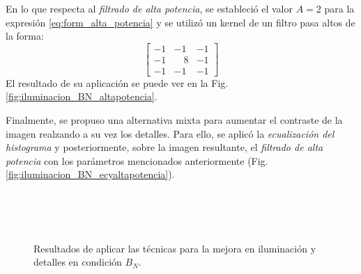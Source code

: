 En lo que respecta al \textit{filtrado de alta potencia}, se estableció el valor $A=2$ para la expresión \eqref{eq:form_alta_potencia} y se utilizó un kernel de un filtro pasa altos de la forma:
\begin{equation}
\label{eq:kernel_altapotencia}
\begin{bmatrix}
-1 & -1 & -1\\
-1 & \quad8 & -1\\
-1 & -1 & -1
\end{bmatrix}
\end{equation}
El resultado de su aplicación se puede ver en la Fig. \ref{fig:iluminacion_BN_altapotencia}.

Finalmente, se propuso una alternativa mixta para aumentar el contraste de la imagen realzando a su vez los detalles. Para ello, se aplicó la \textit{ecualización del histograma} y posteriormente, sobre la imagen resultante, el \textit{filtrado de alta potencia} con los parámetros mencionados anteriormente (Fig. \ref{fig:iluminacion_BN_ecyaltapotencia}).
\begin{figure}
\centering
{}
\\
\\
\\
\caption[Resultados de aplicar las técnicas para la mejora en iluminación y detalles en condición $B_{N}$]{Resultados de aplicar las técnicas para la mejora en iluminación y detalles en condición $B_{N}$.}
\label{fig:mejoras_iluminacion_normal_BN}               %
\end{figure}
